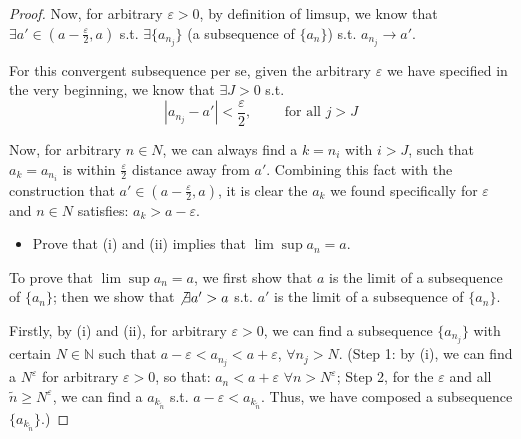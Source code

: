\documentclass[12pt]{article}
\newcommand{\N}{{\mathbb N}}
\theoremstyle{definition}
\theoremstyle{plain}
\begin{document}
\begin{proof}
    Now, for arbitrary $\varepsilon > 0$, by definition of limsup, we know that
    $\exists
    a' \in (a - \frac{\varepsilon}{2}, a)$ s.t. $\exists \{a_{n_j}\}$ (a
    subsequence of $\{a_n\}$) s.t. $a_{n_j} \to a'$.

    For this convergent subsequence per se, given the arbitrary $\varepsilon$ we
    have specified in the very beginning, we know that $\exists J > 0$ s.t.
    \[
        |a_{n_j} - a'| < \frac{\varepsilon}{2}, \qquad
        \text{ for all } j > J
    \]

    Now, for arbitrary $n \in N$, we can always find a $k = n_i$ with $i> J$,
    such that $a_k = a_{n_i}$ is within $\frac{\varepsilon}{2}$ distance away
    from $a'$. Combining this fact with the construction that $a' \in (a -
    \frac{\varepsilon}{2}, a)$, it is clear the $a_k$ we found specifically for
    $\varepsilon$ and $n\in N$ satisfies: $a_k > a - \varepsilon$.



%
%

    \begin{itemize}
        \item Prove that (i) and (ii) implies that $\lim\sup a_n = a$.
    \end{itemize}
    To prove that $\lim\sup a_n = a$, we first show that $a$ is the limit of a
    subsequence of $\{a_n\}$; then we show that $\not\exists a' > a$ s.t. $a'$
    is the limit of a subsequence of $\{a_n\}$.

    Firstly, by (i) and (ii), for arbitrary $\varepsilon>  0$, we can find a
    subsequence $\{a_{n_j}\}$ with certain $N\in \N$
    such that $a - \varepsilon < a_{n_j} < a + \varepsilon$, $\forall n_j > N$.
    (Step 1: by (i), we can find a $N^\varepsilon$ for arbitrary $\varepsilon >
           0$, so that: $a_n < a + \varepsilon$ $\forall n > N^\varepsilon$; Step 2, for the $\varepsilon$
           and all $\tilde n \ge N^\varepsilon$, we can find a $a_{k_{\tilde n}}$
           s.t.  $a - \varepsilon < a_{k_{\tilde n}}$. Thus, we have composed a
       subsequence $\{a_{k_{\tilde n}}\}$.)


\end{proof}
\end{document}
